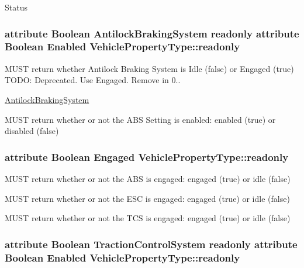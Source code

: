 Status \hypertarget{interfaceVehiclePropertyType_a760d70c9172989d6558d4d6a403df792}{
\subsubsection[{readonly}]{\setlength{\rightskip}{0pt plus 5cm}attribute Boolean {\bf Antilock\+Braking\+System} readonly attribute Boolean Enabled Vehicle\+Property\+Type\+::readonly}}\label{interfaceVehiclePropertyType_a760d70c9172989d6558d4d6a403df792}


M\+U\+S\+T return whether Antilock Braking System is Idle (false) or Engaged (true) T\+O\+D\+O\+: Deprecated. Use Engaged. Remove in 0.. 

\hyperlink{interfaceAntilockBrakingSystem}{Antilock\+Braking\+System}

M\+U\+S\+T return whether or not the A\+B\+S Setting is enabled\+: enabled (true) or disabled (false) \hypertarget{interfaceVehiclePropertyType_a80c4d8f18eee83fc77fded4ac07c687b}{
\subsubsection[{readonly}]{\setlength{\rightskip}{0pt plus 5cm}attribute Boolean Engaged Vehicle\+Property\+Type\+::readonly}}\label{interfaceVehiclePropertyType_a80c4d8f18eee83fc77fded4ac07c687b}


M\+U\+S\+T return whether or not the A\+B\+S is engaged\+: engaged (true) or idle (false) 

M\+U\+S\+T return whether or not the E\+S\+C is engaged\+: engaged (true) or idle (false)

M\+U\+S\+T return whether or not the T\+C\+S is engaged\+: engaged (true) or idle (false) \hypertarget{interfaceVehiclePropertyType_a362c96d9ff226ff1307a26a18e954d48}{
\subsubsection[{readonly}]{\setlength{\rightskip}{0pt plus 5cm}attribute Boolean {\bf Traction\+Control\+System} readonly attribute Boolean Enabled Vehicle\+Property\+Type\+::readonly}}\label{interfaceVehiclePropertyType_a362c96d9ff226ff1307a26a18e954d48}


